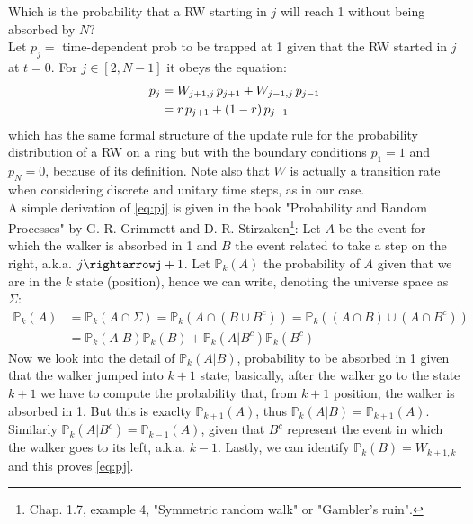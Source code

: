 \documentclass[4apaper,11pt,fleqn]{article}
\theoremstyle{remark}
\theoremstyle{definition}
\begin{document}
Which is the probability that a RW starting in $j$ will reach 1 without being absorbed by $N$?\\
Let $p_j =$ time-dependent prob to be trapped at 1 given that the RW started in $j$ at $t=0$. For $j \in [2,N-1]$ it obeys the equation:
\begin{align}
  \label{eq:pj}
  p_{j} &=W_{j+1, j} \, p_{j+1} + W_{j-1, j}\, p_{j-1} \\ \notag
  &=r\, p_{j+1}  + (1-r)\, p_{j-1}
\end{align}
which has the same formal structure of the update rule for the probability distribution of a RW on a ring but with the boundary conditions $p_1 = 1$ and $p_N = 0$, because of its definition.
Note also that $W$ is actually a transition rate when considering discrete and unitary time steps, as in our case.\\
A simple derivation of \eqref{eq:pj} is given in the book "Probability and Random Processes" by G. R. Grimmett and D. R. Stirzaken\footnote{Chap. 1.7, example 4, "Symmetric random walk" or "Gambler's ruin".}: Let $A$ be the event for which the walker is absorbed in 1 and $B$ the event related to take a step on the right, a.k.a. $j\rightarrowj+1$. Let $\mathbb{P}_k(A)$ the probability of $A$ given that we are in the $k$ state (position), hence we can write, denoting the universe space as $\Sigma$:
\begin{align*}
  \mathbb{P}_{k}(A) &= \mathbb{P}_k (A \cap \Sigma) = \mathbb{P}_k (A \cap (B \cup B^c) ) = \mathbb{P}_k ( (A\cap B ) \cup ( A \cap B^c ) ) \\
                    &= \mathbb{P}_{k}(A | B) \mathbb{P}_k (B)+\mathbb{P}_{k}\left(A | B^{c}\right) \mathbb{P}_k \left(B^{c}\right)
\end{align*}
Now we look into the detail of $\mathbb{P}_{k}(A | B)$, probability to be absorbed in 1 given that the walker jumped into $k+1$ state; basically, after the walker go to the state $k+1$ we have to compute the probability that, from $k+1$ position, the walker is absorbed in 1. But this is exaclty $\mathbb{P}_{k+1} (A)$, thus $\mathbb{P}_{k}(A | B) = \mathbb{P}_{k+1} (A)$. Similarly $\mathbb{P}_{k}(A | B^c) = \mathbb{P}_{k-1} (A)$, given that $B^c$ represent the event in which the walker goes to its left, a.k.a. $k-1$.
Lastly, we can identify $\mathbb{P}_k (B) = W_{k+1,k}$ and this proves \eqref{eq:pj}.


\end{document}
